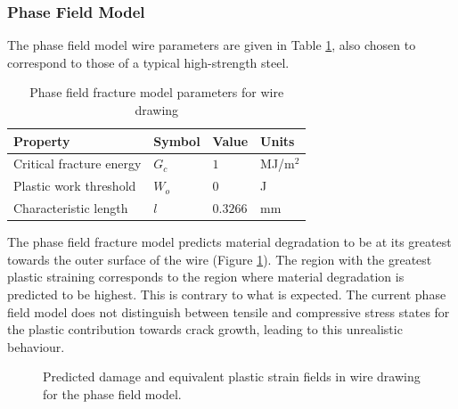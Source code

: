\documentclass[sn-mathphys,Numbered]{sn-jnl}%
\begin{document}
\subsubsection{Phase Field Model}
The phase field model wire parameters are given in Table \ref{tab:PF_wire_draw_mat}, also chosen to correspond to those of a typical high-strength steel.
\begin{table}[htb]
	\centering
		\begin{tabular}{llll} \hline
			Property & Symbol & Value & Units  \\ \hline 
			Critical fracture energy & $G_c$ & $1$ & MJ/m$^2$ \\
   			Plastic work threshold & $W_o$ & $0$ & J \\
			Characteristic length & $l$ & $0.3266$ & mm   \\
			\hline
		\end{tabular}
	\caption{Phase field fracture model parameters for wire drawing}
	\label{tab:PF_wire_draw_mat}
\end{table}

The phase field fracture model predicts material degradation to be at its greatest towards the outer surface of the wire (Figure \ref{fig:PF_wire_draw}).
The region with the greatest plastic straining corresponds to the region where material degradation is predicted to be highest.
This is contrary to what is expected.
The current phase field model does not distinguish between tensile and compressive stress states for the plastic contribution towards crack growth, leading to this unrealistic behaviour.
\begin{figure}[htbp]
	\centering
	  \qquad
	\caption{Predicted damage and equivalent plastic strain fields in wire drawing for the phase field model.}
	\label{fig:PF_wire_draw}
\end{figure}
\end{document}
